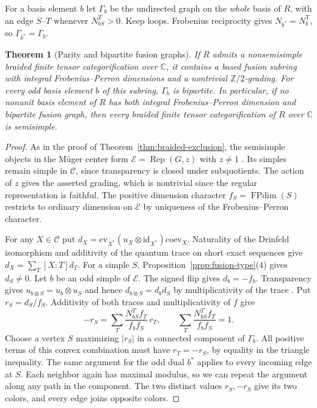 \documentclass[11pt,reqno]{amsart}
\newtheorem{theorem}{Theorem}[section]
\theoremstyle{definition}
\newcommand{\FPdim}{\operatorname{FPdim}}
\newcommand{\C}{\mathcal C}
\newcommand{\CC}{\mathbb C}
\newcommand{\ZZ}{\mathbb Z}
\newcommand{\Rep}{\operatorname{Rep}}
\begin{document}
For a basis element $b$ let $\Gamma_b$ be the undirected graph on the \emph{whole} basis of $R$, with an edge $S$--$T$ whenever $N_{bS}^{T}>0$. Keep loops. Frobenius reciprocity gives $N_{b^*}=N_b^{\mathsf T}$, so $\Gamma_{b^*}=\Gamma_b$.

\begin{theorem}[Parity and bipartite fusion graphs]\label{thm:graded-subring}\label{thm:bipartite}
If $R$ admits a nonsemisimple braided finite tensor categorification over $\CC$, it contains a based fusion subring with integral Frobenius--Perron dimensions and a nontrivial $\ZZ/2$-grading. For every odd basis element $b$ of this subring, $\Gamma_b$ is bipartite. In particular, if no nonunit basis element of $R$ has both integral Frobenius--Perron dimension and bipartite fusion graph, then every braided finite tensor categorification of $R$ over $\CC$ is semisimple.
\end{theorem}
\begin{proof}
As in the proof of Theorem~\ref{thm:braided-exclusion}, the semisimple objects in the M\"uger center form $\mathcal E=\Rep(G,z)$ with $z\ne1$ \cite[Theorem~9.11.9 and Exercise~9.11.13(i)--(ii)]{EGNO}. Its simples remain simple in $\C$, since transparency is closed under subquotients. The action of $z$ gives the asserted grading, which is nontrivial since the regular representation is faithful. The positive dimension character $f_S=\FPdim(S)$ restricts to ordinary dimension on $\mathcal E$ by uniqueness of the Frobenius--Perron character.

For any $X\in\C$ put $d_X=\mathrm{ev}_{X^*}(u_X\otimes\mathrm{id}_{X^*})\mathrm{coev}_X$. Naturality of the Drinfeld isomorphism and additivity of the quantum trace on short exact sequences \cite[Proposition~4.7.5]{EGNO} give $d_X=\sum_T[X:T]d_T$. For a simple $S$, Proposition~\ref{prop:fusion-type}(4) gives $d_S\ne0$. Let $b$ be an odd simple of $\mathcal E$. The signed flip gives $d_b=-f_b$. Transparency gives $u_{b\otimes S}=u_b\otimes u_S$ and hence $d_{b\otimes S}=d_b d_S$ by multiplicativity of the trace \cite[Proposition~4.7.3(3)]{EGNO}. Put $r_S=d_S/f_S$. Additivity of both traces and multiplicativity of $f$ give
\[
 -r_S=\sum_T\frac{N_{bS}^{T}f_T}{f_b f_S}\,r_T,
 \qquad \sum_T\frac{N_{bS}^{T}f_T}{f_b f_S}=1 .
\]
Choose a vertex $S$ maximizing $|r_S|$ in a connected component of $\Gamma_b$. All positive terms of this convex combination must have $r_T=-r_S$, by equality in the triangle inequality. The same argument for the odd dual $b^*$ applies to every incoming edge at $S$. Each neighbor again has maximal modulus, so we can repeat the argument along any path in the component. The two distinct values $r_S,-r_S$ give its two colors, and every edge joins opposite colors.
\end{proof}
\end{document}
